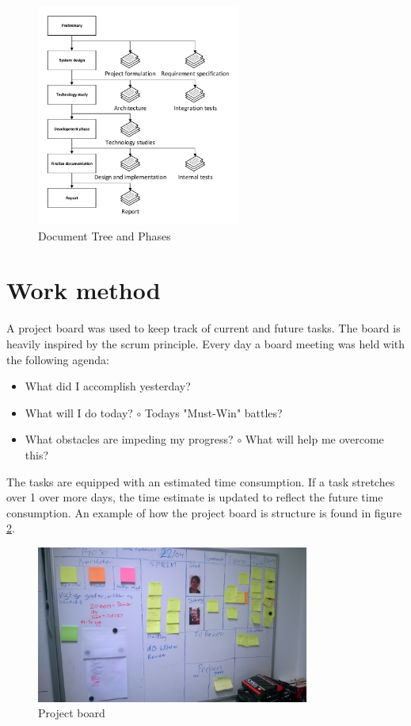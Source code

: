 \begin{figure}[H]
\centering
\includegraphics[width=0.6\textwidth]{billeder/DocumentTree}
\caption{Document Tree and Phases}
\label{fig:doctree}
\end{figure}

\section{Work method}
A project board was used to keep track of current and future tasks. The board is heavily inspired by the scrum principle. Every day a board meeting was held with the following agenda:
\begin{itemize}
\item What did I accomplish yesterday?
\item What will I do today?
\subitem $\circ$ Todays "Must-Win" battles?
\item What obstacles are impeding my progress?
\subitem $\circ$ What will help me overcome this?
\end{itemize}
The tasks are equipped with an estimated time consumption. If a task stretches over 1 over more days, the time estimate is updated to reflect the future time consumption. An example of how the project board is structure is found in figure \ref{fig:prjboard}.
\begin{figure}[H]
\centering
\includegraphics[width=0.8\textwidth]{billeder/board}
\caption{Project board}
\label{fig:prjboard}
\end{figure}

